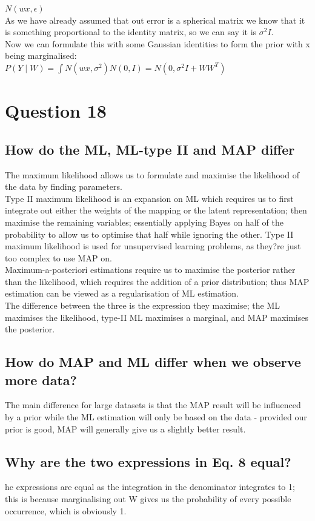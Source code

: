 \documentclass[a4paper, 9pt]{article}
\begin{document}
\( N (wx, \epsilon) \) \\

As we have already assumed that out error is a spherical matrix we know that it is something proportional to the identity matrix, so we can say it is \( \sigma^2 I \). \\
Now we can formulate this with some Gaussian identities to form the prior with x being marginalised: \\

\( P(Y \mid W) = \int N(wx, \sigma^2) N(0, I) = N(0, \sigma^2 I + WW^T) \)

\section*{Question 18}
\subsection*{How do the ML, ML-type II and MAP differ}
The maximum likelihood allows us to formulate and maximise the likelihood of the data by finding parameters. \\
Type II maximum likelihood is an expansion on ML which requires us to first integrate out either the weights of the mapping or the latent representation; then maximise the remaining variables; essentially applying Bayes on half of the probability to allow us to optimise that half while ignoring the other. Type II maximum likelihood is used for unsupervised learning problems, as they?re just too complex to use MAP on. \\
Maximum-a-posteriori estimations require us to maximise the posterior rather than the likelihood, which requires the addition of a prior distribution; thus MAP estimation can be viewed as a regularisation of ML estimation. \\
The difference between the three is the expression they maximise; the ML maximises the likelihood, type-II ML maximises a marginal, and MAP maximises the posterior.
\subsection*{How do MAP and ML differ when we observe more data?}
The main difference for large datasets is that the MAP result will be influenced by a prior while the ML estimation will only be based on the data - provided our prior is good, MAP will generally give us a slightly better result.
\subsection*{Why are the two expressions in Eq. 8 equal?}
he expressions are equal as the integration in the denominator integrates to 1; this is because marginalising out W gives us the probability of every possible occurrence, which is obviously 1.
\end{document}

